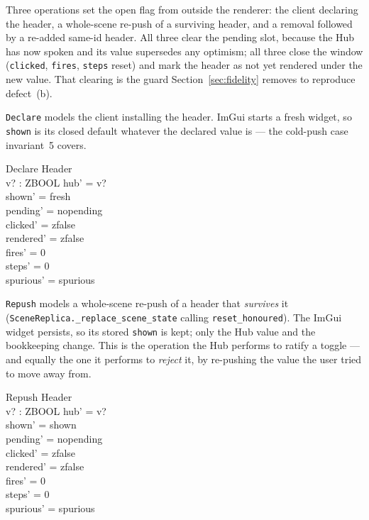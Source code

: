 \documentclass[a4paper,10pt,fleqn]{article}
\begin{document}
Three operations set the open flag from outside the renderer: the client
declaring the header, a whole-scene re-push of a surviving header, and a
removal followed by a re-added same-id header.  All three clear the pending
slot, because the Hub has now spoken and its value supersedes any optimism;
all three close the window (\texttt{clicked}, \texttt{fires}, \texttt{steps}
reset) and mark the header as not yet rendered under the new value.  That
clearing is the guard Section~\ref{sec:fidelity} removes to reproduce
defect~(b).

\texttt{Declare} models the client installing the header.  ImGui starts a fresh
widget, so \texttt{shown} is its closed default whatever the declared value is
--- the cold-push case invariant~5 covers.

\begin{schema}{Declare}
  \Delta Header \\
  v? : ZBOOL
\where
  hub' = v? \\
  shown' = fresh \\
  pending' = nopending \\
  clicked' = zfalse \\
  rendered' = zfalse \\
  fires' = 0 \\
  steps' = 0 \\
  spurious' = spurious
\end{schema}

\texttt{Repush} models a whole-scene re-push of a header that \emph{survives}
it (\texttt{SceneReplica.\_replace\_scene\_state} calling
\texttt{reset\_honoured}).  The ImGui widget persists, so its stored
\texttt{shown} is kept; only the Hub value and the bookkeeping change.  This is
the operation the Hub performs to ratify a toggle --- and equally the one it
performs to \emph{reject} it, by re-pushing the value the user tried to move
away from.

\begin{schema}{Repush}
  \Delta Header \\
  v? : ZBOOL
\where
  hub' = v? \\
  shown' = shown \\
  pending' = nopending \\
  clicked' = zfalse \\
  rendered' = zfalse \\
  fires' = 0 \\
  steps' = 0 \\
  spurious' = spurious
\end{schema}
\end{document}
